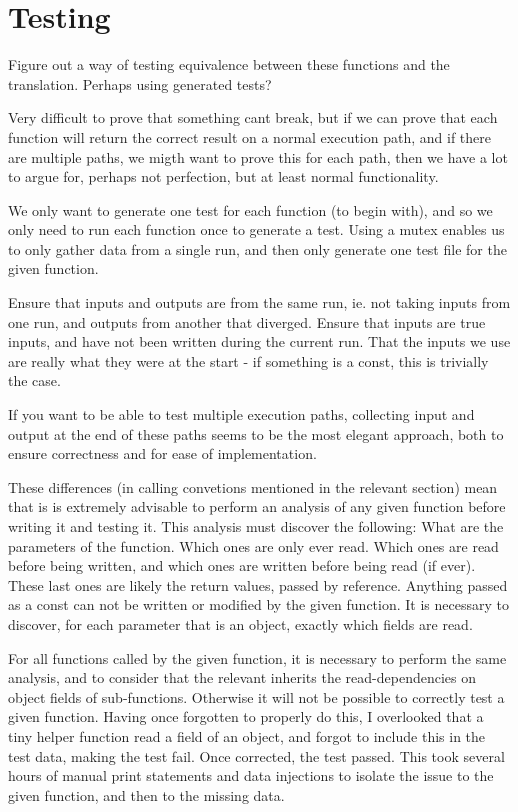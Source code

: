 \section{Testing}

Figure out a way of testing equivalence between these functions and the translation. Perhaps using generated tests?

Very difficult to prove that something cant break, but if we can prove that each function will return the correct result on a normal execution path, and if there are multiple paths, we migth want to prove this for each path, then we have a lot to argue for, perhaps not perfection, but at least normal functionality.

We only want to generate one test for each function (to begin with), and so we only need to run each function once to generate a test. Using a mutex enables us to only gather data from a single run, and then only generate one test file for the given function.

Ensure that inputs and outputs are from the same run, ie. not taking inputs from one run, and outputs from another that diverged.
Ensure that inputs are true inputs, and have not been written during the current run. That the inputs we use are really what they were at the start - if something is a const, this is trivially the case.

If you want to be able to test multiple execution paths, collecting input and output at the end of these paths seems to be the most elegant approach, both to ensure correctness and for ease of implementation.





These differences (in calling convetions mentioned in the relevant section) mean that is is extremely advisable to perform an analysis of any given function before writing it and testing it. This analysis must discover the following: What are the parameters of the function. Which ones are only ever read. Which ones are read before being written, and which ones are written before being read (if ever). These last ones are likely the return values, passed by reference. Anything passed as a const can not be written or modified by the given function. It is necessary to discover, for each parameter that is an object, exactly which fields are read.

For all functions called by the given function, it is necessary to perform the same analysis, and to consider that the relevant inherits the read-dependencies on object fields of sub-functions. Otherwise it will not be possible to correctly test a given function. Having once forgotten to properly do this, I overlooked that a tiny helper function read a field of an object, and forgot to include this in the test data, making the test fail. Once corrected, the test passed. This took several hours of manual print statements and data injections to isolate the issue to the given function, and then to the missing data.
